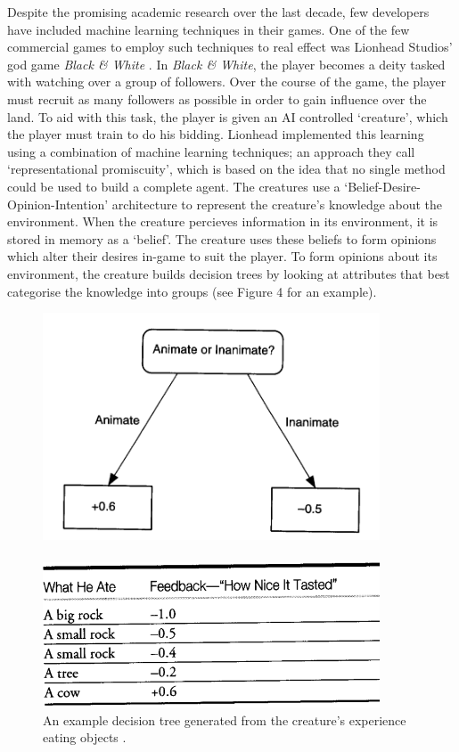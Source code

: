 \documentclass[a4paper,oneside]{report}
\begin{document}
Despite the promising academic research over the last decade, few developers have included machine learning techniques in their games. One of the few commercial games to employ such techniques to real effect was Lionhead Studios' god game \emph{Black \& White} \cite{:hc}. In \emph{Black \& White}, the player becomes a deity tasked with watching over a group of followers. Over the course of the game, the player must recruit as many followers as possible in order to gain influence over the land. To aid with this task, the player is given an AI controlled `creature', which the player must train to do his bidding. Lionhead implemented this learning using a combination of machine learning techniques; an approach they call `representational promiscuity', which is based on the idea that no single method could be used to build a complete agent. The creatures use a `Belief-Desire-Opinion-Intention' architecture to represent the creature's knowledge about the environment. When the creature percieves information in its environment, it is stored in memory as a `belief'. The creature uses these beliefs to form opinions which alter their desires in-game to suit the player. To form opinions about its environment, the creature builds decision trees by looking at attributes that best categorise the knowledge into groups (see Figure 4 for an example).

\begin{figure}[h!]
	\centering
		\includegraphics[width=100mm]{sources/images/TastyTree}\paragraph{}
    	\includegraphics[width=100mm]{sources/images/TastyTable}
    	\caption{An example decision tree generated from the creature's experience eating objects \cite{:hc}.}
\end{figure}
\end{document}
